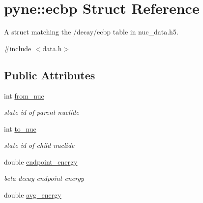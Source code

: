 \hypertarget{structpyne_1_1ecbp}{}\section{pyne\+:\+:ecbp Struct Reference}
\label{structpyne_1_1ecbp}


A struct matching the \textquotesingle{}/decay/ecbp\textquotesingle{} table in nuc\+\_\+data.\+h5.  




{\ttfamily \#include $<$data.\+h$>$}

\subsection*{Public Attributes}
\begin{DoxyCompactItemize}
\item 
int \hyperlink{structpyne_1_1ecbp_a0f0a1b5d1058f568e1a9c272a8ccdbb4}{from\+\_\+nuc}\hypertarget{structpyne_1_1ecbp_a0f0a1b5d1058f568e1a9c272a8ccdbb4}{}\label{structpyne_1_1ecbp_a0f0a1b5d1058f568e1a9c272a8ccdbb4}

\begin{DoxyCompactList}\small\item\em state id of parent nuclide \end{DoxyCompactList}\item 
int \hyperlink{structpyne_1_1ecbp_a92cad3076b4ede90958ff54a5d42d9c6}{to\+\_\+nuc}\hypertarget{structpyne_1_1ecbp_a92cad3076b4ede90958ff54a5d42d9c6}{}\label{structpyne_1_1ecbp_a92cad3076b4ede90958ff54a5d42d9c6}

\begin{DoxyCompactList}\small\item\em state id of child nuclide \end{DoxyCompactList}\item 
double \hyperlink{structpyne_1_1ecbp_aa45b0d60f6e64b89f9eb7f6ecac34075}{endpoint\+\_\+energy}\hypertarget{structpyne_1_1ecbp_aa45b0d60f6e64b89f9eb7f6ecac34075}{}\label{structpyne_1_1ecbp_aa45b0d60f6e64b89f9eb7f6ecac34075}

\begin{DoxyCompactList}\small\item\em beta decay endpoint energy \end{DoxyCompactList}\item 
double \hyperlink{structpyne_1_1ecbp_a2ecaf87cb93b936c48f89465958d47f7}{avg\+\_\+energy}\hypertarget{structpyne_1_1ecbp_a2ecaf87cb93b936c48f89465958d47f7}{}\label{structpyne_1_1ecbp_a2ecaf87cb93b936c48f89465958d47f7}


\end{DoxyCompactItemize}
